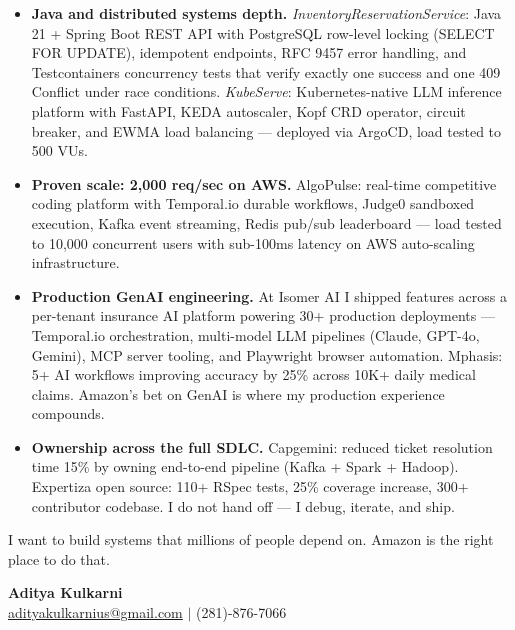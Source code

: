 \documentclass[11pt,letterpaper]{article}
\begin{document}
\begin{itemize}
  \item[\faAngleRight] \textbf{Java and distributed systems depth.} \textit{InventoryReservationService}: Java 21 + Spring Boot REST API with PostgreSQL row-level locking (SELECT FOR UPDATE), idempotent endpoints, RFC 9457 error handling, and Testcontainers concurrency tests that verify exactly one success and one 409 Conflict under race conditions. \textit{KubeServe}: Kubernetes-native LLM inference platform with FastAPI, KEDA autoscaler, Kopf CRD operator, circuit breaker, and EWMA load balancing --- deployed via ArgoCD, load tested to 500 VUs.

  \item[\faAngleRight] \textbf{Proven scale: 2,000 req/sec on AWS.} AlgoPulse: real-time competitive coding platform with Temporal.io durable workflows, Judge0 sandboxed execution, Kafka event streaming, Redis pub/sub leaderboard --- load tested to 10,000 concurrent users with sub-100ms latency on AWS auto-scaling infrastructure.

  \item[\faAngleRight] \textbf{Production GenAI engineering.} At Isomer AI I shipped features across a per-tenant insurance AI platform powering 30+ production deployments --- Temporal.io orchestration, multi-model LLM pipelines (Claude, GPT-4o, Gemini), MCP server tooling, and Playwright browser automation. Mphasis: 5+ AI workflows improving accuracy by 25\% across 10K+ daily medical claims. Amazon's bet on GenAI is where my production experience compounds.

  \item[\faAngleRight] \textbf{Ownership across the full SDLC.} Capgemini: reduced ticket resolution time 15\% by owning end-to-end pipeline (Kafka + Spark + Hadoop). Expertiza open source: 110+ RSpec tests, 25\% coverage increase, 300+ contributor codebase. I do not hand off --- I debug, iterate, and ship.
\end{itemize}

\vspace{8pt}

I want to build systems that millions of people depend on. Amazon is the right place to do that.

\vspace{12pt}

{\color{AmazonOrange} \textbf{Aditya Kulkarni}} \\
\href{mailto:adityakulkarnius@gmail.com}{adityakulkarnius@gmail.com} \quad $|$ \quad (281)-876-7066
\end{document}
